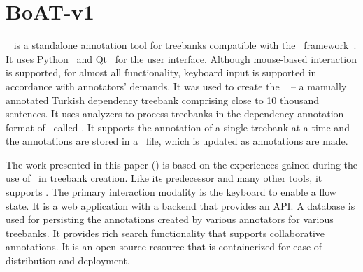 \section{BoAT-v1}
\label{sec:boatvone}

\boatvone~\cite{turk-etal-2019-turkish} is a standalone annotation tool for treebanks compatible with the \ud\ framework~\cite{UD}.
It uses Python~\cite{python} and Qt~\cite{qt} for the user interface.
Although mouse-based interaction is supported, for almost all functionality, keyboard input is supported in accordance with annotators' demands.
It was used to create the \bountreebank~\cite{turk-etal-2019-turkish,turk2021resources,UD-Boun-Treebank} -- a manually annotated Turkish dependency treebank comprising close to 10 thousand sentences.
It uses analyzers to process treebanks in the dependency annotation format of \ud\ called \conllu.
It supports the annotation of a single treebank at a time and the annotations are stored in a \conllu\ file, which is updated as annotations are made.

The work presented in this paper (\boatvtwo) is based on the experiences gained during the use of \boatvone\ in treebank creation.
Like its predecessor and many other tools, it supports \ud.
The primary interaction modality is the keyboard to enable a flow state.
It is a web application with a backend that provides an API.
A database is used for persisting the annotations created by various annotators for various treebanks.
It provides rich search functionality that supports collaborative annotations.
It is an open-source resource that is containerized for ease of distribution and deployment.
